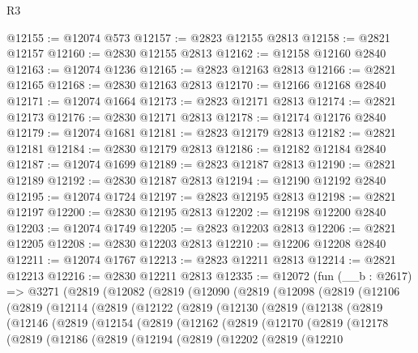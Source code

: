 \begin{lexlean}{R3}
\begin{coremodule}
@12155 := @12074 @573
@12157 := @2823 @12155 @2813
@12158 := @2821 @12157
@12160 := @2830 @12155 @2813
@12162 := @12158 @12160 @2840
@12163 := @12074 @1236
@12165 := @2823 @12163 @2813
@12166 := @2821 @12165
@12168 := @2830 @12163 @2813
@12170 := @12166 @12168 @2840
@12171 := @12074 @1664
@12173 := @2823 @12171 @2813
@12174 := @2821 @12173
@12176 := @2830 @12171 @2813
@12178 := @12174 @12176 @2840
@12179 := @12074 @1681
@12181 := @2823 @12179 @2813
@12182 := @2821 @12181
@12184 := @2830 @12179 @2813
@12186 := @12182 @12184 @2840
@12187 := @12074 @1699
@12189 := @2823 @12187 @2813
@12190 := @2821 @12189
@12192 := @2830 @12187 @2813
@12194 := @12190 @12192 @2840
@12195 := @12074 @1724
@12197 := @2823 @12195 @2813
@12198 := @2821 @12197
@12200 := @2830 @12195 @2813
@12202 := @12198 @12200 @2840
@12203 := @12074 @1749
@12205 := @2823 @12203 @2813
@12206 := @2821 @12205
@12208 := @2830 @12203 @2813
@12210 := @12206 @12208 @2840
@12211 := @12074 @1767
@12213 := @2823 @12211 @2813
@12214 := @2821 @12213
@12216 := @2830 @12211 @2813
@12335 := @12072
    (fun (__b : @2617) =>
    @3271
      (@2819
        (@12082
          (@2819
            (@12090
              (@2819
                (@12098
                  (@2819
                    (@12106
                      (@2819
                        (@12114
                          (@2819
                            (@12122
                              (@2819
                                (@12130
                                  (@2819
                                    (@12138
                                      (@2819
                                        (@12146
                                          (@2819
                                            (@12154
                                              (@2819
                                                (@12162
                                                  (@2819
                                                    (@12170
                                                      (@2819
                                                        (@12178
                                                          (@2819
                                                            (@12186
                                                              (@2819
                                                                (@12194
                                                                  (@2819
                                                                    (@12202
                                                                      (@2819
                                                                        (@12210

\end{coremodule}
\end{lexlean}
